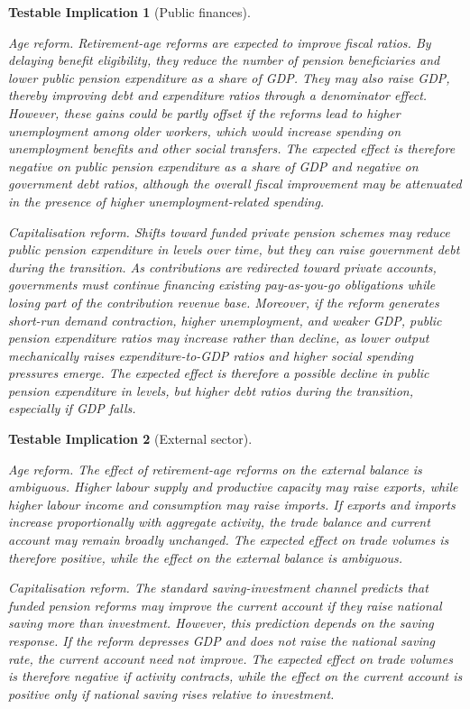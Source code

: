 \documentclass[11pt,english,a4paper, twoside, authoryear]{article}
\newtheorem{testable}{Testable Implication}}
\begin{document}
\begin{testable}[Public finances]\label{test:public_finances}

    
\emph{Age reform.} Retirement-age reforms are expected to improve fiscal ratios. By delaying benefit eligibility, they reduce the number of pension beneficiaries and lower public pension expenditure as a share of GDP. They may also raise GDP, thereby improving debt and expenditure ratios through a denominator effect. However, these gains could be partly offset if the reforms lead to higher unemployment among older workers, which would increase spending on unemployment benefits and other social transfers. The expected effect is therefore negative on public pension expenditure as a share of GDP and negative on government debt ratios, although the overall fiscal improvement may be attenuated in the presence of higher unemployment-related spending.

\emph{Capitalisation reform.} Shifts toward funded private pension schemes may reduce public pension expenditure in levels over time, but they can raise government debt during the transition. As contributions are redirected toward private accounts, governments must continue financing existing pay-as-you-go obligations while losing part of the contribution revenue base. Moreover, if the reform generates short-run demand contraction, higher unemployment, and weaker GDP, public pension expenditure ratios may increase rather than decline, as lower output mechanically raises expenditure-to-GDP ratios and higher social spending pressures emerge. The expected effect is therefore a possible decline in public pension expenditure in levels, but higher debt ratios during the transition, especially if GDP falls.
 
\end{testable}

\begin{testable}[External sector]\label{test:external}

\emph{Age reform.} The effect of retirement-age reforms on the external balance is ambiguous. Higher labour supply and productive capacity may raise exports, while higher labour income and consumption may raise imports. If exports and imports increase proportionally with aggregate activity, the trade balance and current account may remain broadly unchanged. The expected effect on trade volumes is therefore positive, while the effect on the external balance is ambiguous.

\emph{Capitalisation reform.} The standard saving-investment channel predicts that funded pension reforms may improve the current account if they raise national saving more than investment. However, this prediction depends on the saving response. If the reform depresses GDP and does not raise the national saving rate, the current account need not improve. The expected effect on trade volumes is therefore negative if activity contracts, while the effect on the current account is positive only if national saving rises relative to investment.

\end{testable}
\end{document}
